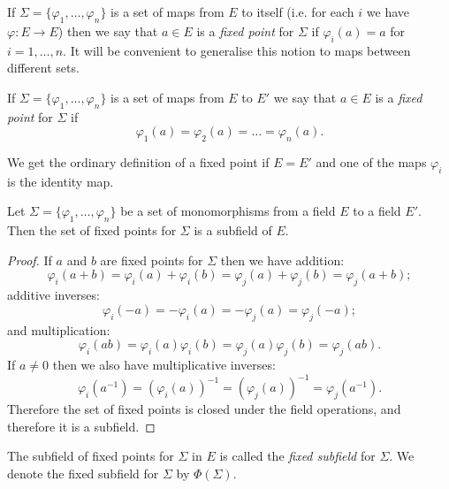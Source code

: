 If $\Sigma = \{\varphi_1, \dots, \varphi_n\}$ is a set of maps from $E$ to itself (i.e. for each $i$ we have $\varphi : E \to E$) then we say that $a \in E$ is a \emph{fixed point} for $\Sigma$ if $\varphi_i(a) = a$ for $i = 1, \dots, n$. It will be convenient to generalise this notion to maps between different sets.

\begin{definition}
	If $\Sigma = \{\varphi_1, \dots, \varphi_n\}$ is a set of maps from $E$ to $E'$ we say that $a \in E$ is a \emph{fixed point} for $\Sigma$ if
	\[
		\varphi_1(a) = \varphi_2(a) = \dots = \varphi_n(a).
	\]
\end{definition}

\begin{note}
	We get the ordinary definition of a fixed point if $E = E'$ and one of the maps $\varphi_i$ is the identity map.
\end{note}

\begin{lemma}
	Let $\Sigma = \{\varphi_1, \dots, \varphi_n\}$ be a set of monomorphisms from a field $E$ to a field $E'$. Then the set of fixed points for $\Sigma$ is a subfield of $E$.
	\begin{proof}
		If $a$ and $b$ are fixed points for $\Sigma$ then we have addition:
		\[
			\varphi_i(a + b) = \varphi_i(a) + \varphi_i(b) = \varphi_j(a) + \varphi_j(b) = \varphi_j(a + b);
		\]
		additive inverses:
		\[
			\varphi_i(-a) = -\varphi_i(a) = -\varphi_j(a) = \varphi_j(-a);
		\]
		and multiplication:
		\[
			\varphi_i(ab) = \varphi_i(a) \varphi_i(b) = \varphi_j(a) \varphi_j(b) = \varphi_j(ab).
		\]
		If $a \neq 0$ then we also have multiplicative inverses:
		\[
			\varphi_i(a^{-1}) = (\varphi_i(a))^{-1} = (\varphi_j(a))^{-1} = \varphi_j(a^{-1}).
		\]
		Therefore the set of fixed points is closed under the field operations, and therefore it is a subfield.
	\end{proof}
\end{lemma}

The subfield of fixed points for $\Sigma$ in $E$ is called the \emph{fixed subfield} for $\Sigma$. We denote the fixed subfield for $\Sigma$ by $\Phi(\Sigma)$.

